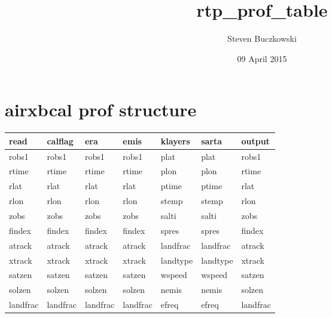 \documentclass[11pt]{article}
\title{rtp_prof_table}
\author{Steven Buczkowski}
\date{09 April 2015}
\begin{document}
\maketitle

\setcounter{tocdepth}{3}
\tableofcontents
\vspace*{1cm}

\section{airxbcal prof structure}
\label{sec-1}



\begin{center}
\begin{tabular}{lllllll}
 read      &  calflag   &  era       &  emis      &  \textbf{klayers}      &  \textbf{sarta}        &  output    \\
\hline
 {\cellcolor[c1]{0.8}} robs1     &  robs1     &  robs1     &  robs1     &  plat                  &  plat                  &  robs1     \\
 rtime     &  rtime     &  rtime     &  rtime     &  plon                  &  plon                  &  rtime     \\
 rlat      &  rlat      &  rlat      &  rlat      &  ptime                 &  ptime                 &  rlat      \\
 rlon      &  rlon      &  rlon      &  rlon      &  stemp                 &  stemp                 &  rlon      \\
 zobs      &  zobs      &  zobs      &  zobs      &  salti                 &  salti                 &  zobs      \\
 findex    &  findex    &  findex    &  findex    &  spres                 &  spres                 &  findex    \\
 atrack    &  atrack    &  atrack    &  atrack    &  landfrac              &  landfrac              &  atrack    \\
 xtrack    &  xtrack    &  xtrack    &  xtrack    &  landtype              &  landtype              &  xtrack    \\
 satzen    &  satzen    &  satzen    &  satzen    &  wspeed                &  wspeed                &  satzen    \\
 solzen    &  solzen    &  solzen    &  solzen    &  nemis                 &  nemis                 &  solzen    \\
 landfrac  &  landfrac  &  landfrac  &  landfrac  &  efreq                 &  efreq                 &  landfrac  \\

\end{tabular}
\end{center}
\end{document}

